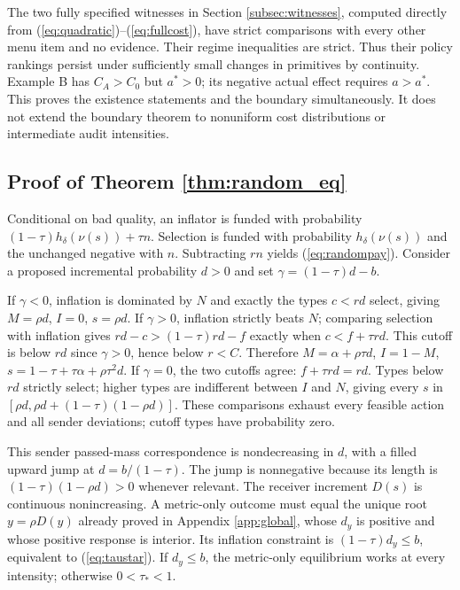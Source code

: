 \documentclass[11pt]{article}
\begin{document}
The two fully specified witnesses in Section \ref{subsec:witnesses}, computed directly from (\ref{eq:quadratic})--(\ref{eq:fullcost}), have strict comparisons with every other menu item and no evidence. Their regime inequalities are strict. Thus their policy rankings persist under sufficiently small changes in primitives by continuity. Example B has $C_A>C_0$ but $a^*>0$; its negative actual effect requires $a>a^*$. This proves the existence statements and the boundary simultaneously. It does not extend the boundary theorem to nonuniform cost distributions or intermediate audit intensities.

\subsection{Proof of Theorem \ref{thm:random_eq}}\label{app:random_eq}
Conditional on bad quality, an inflator is funded with probability $(1-\tau)h_\delta(\nu(s))+\tau n$. Selection is funded with probability $h_\delta(\nu(s))$ and the unchanged negative with $n$. Subtracting $rn$ yields (\ref{eq:randompay}). Consider a proposed incremental probability $d>0$ and set $\gamma=(1-\tau)d-b$.

If $\gamma<0$, inflation is dominated by $N$ and exactly the types $c<rd$ select, giving $M=\rho d$, $I=0$, $s=\rho d$. If $\gamma>0$, inflation strictly beats $N$; comparing selection with inflation gives $rd-c>(1-\tau)rd-f$ exactly when $c<f+\tau rd$. This cutoff is below $rd$ since $\gamma>0$, hence below $r<C$. Therefore $M=\alpha+\rho\tau d$, $I=1-M$, $s=1-\tau+\tau\alpha+\rho\tau^2d$. If $\gamma=0$, the two cutoffs agree: $f+\tau rd=rd$. Types below $rd$ strictly select; higher types are indifferent between $I$ and $N$, giving every $s$ in $[\rho d,\rho d+(1-\tau)(1-\rho d)]$. These comparisons exhaust every feasible action and all sender deviations; cutoff types have probability zero.

This sender passed-mass correspondence is nondecreasing in $d$, with a filled upward jump at $d=b/(1-\tau)$. The jump is nonnegative because its length is $(1-\tau)(1-\rho d)>0$ whenever relevant. The receiver increment $D(s)$ is continuous nonincreasing. A metric-only outcome must equal the unique root $y=\rho D(y)$ already proved in Appendix \ref{app:global}, whose $d_y$ is positive and whose positive response is interior. Its inflation constraint is $(1-\tau)d_y\leq b$, equivalent to (\ref{eq:taustar}). If $d_y\leq b$, the metric-only equilibrium works at every intensity; otherwise $0<\tau_*<1$.
\end{document}
